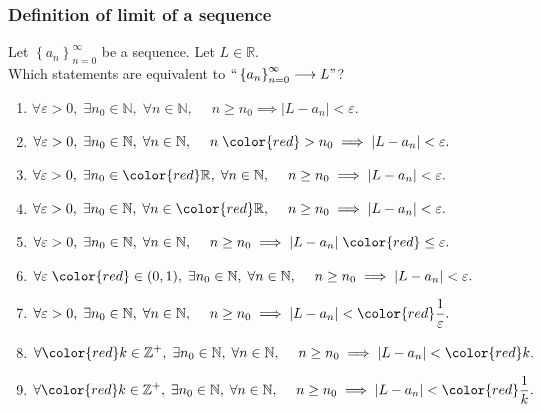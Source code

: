 \begin{frame}[t]
	\fontsize{13}{13}\selectfont
	\frametitle{Definition of limit of a sequence}

	Let $\displaystyle \left\{ a_{n} \right\}_{n=0}^{\infty}$ be a sequence. Let
	$\displaystyle L \in \mathbb{R}$. \\ Which statements are equivalent to $\displaystyle
	``\left\{ a_{n} \right\}_{n=0}^{\infty}\longrightarrow L"$?

	\begin{enumerate}
		\item $\displaystyle \forall \varepsilon>0, \; \exists n_{0}\in \mathbb{N}, \;
			\forall n \in \mathbb{N}, \; \quad n \geq n_{0}\implies |L-a_{n}| < \varepsilon
			.$

		\item $\displaystyle \forall \varepsilon>0, \; \exists n_{0}\in \mathbb{N}, \;
			\forall n \in \mathbb{N}, \; \quad n \;{\color{red} > }\; n_{0}\implies |L-
			a_{n}| < \varepsilon.$

		\item $\displaystyle \forall \varepsilon>0, \; \exists n_{0}\in{\color{red} \mathbb{R}}
			, \; \forall n \in \mathbb{N}, \; \quad n \geq n_{0}\implies |L-a_{n}| < \varepsilon
			.$

		\item $\displaystyle \forall \varepsilon>0, \; \exists n_{0}\in \mathbb{N}, \;
			\forall n \in{\color{red} \mathbb{R}}, \; \quad n \geq n_{0}\implies |L-a_{n}
			| < \varepsilon.$

		\item $\displaystyle \forall \varepsilon>0, \; \exists n_{0}\in \mathbb{N}, \;
			\forall n \in \mathbb{N}, \; \quad n \geq n_{0}\implies |L-a_{n}| \;{\color{red} \leq}
			\; \varepsilon.$

		\item $\displaystyle \forall \varepsilon \;{\color{red} \in (0,1)}, \; \exists
			n_{0}\in \mathbb{N}, \; \forall n \in \mathbb{N}, \; \quad n \geq n_{0}\implies
			|L-a_{n}| < \varepsilon.$

		\item $\displaystyle \forall \varepsilon>0, \; \exists n_{0}\in \mathbb{N}, \;
			\forall n \in \mathbb{N}, \; \quad n \geq n_{0}\implies |L-a_{n}| <{\color{red} \frac{1}{\varepsilon}}
			.$

		\item $\displaystyle \forall{\color{red} k \in \mathbb{Z}^{+}}, \; \exists n_{0}
			\in \mathbb{N}, \; \forall n \in \mathbb{N}, \; \quad n \geq n_{0}\implies
			|L-a_{n}| <{\color{red} k}.$

		\item $\displaystyle \forall{\color{red} k \in \mathbb{Z}^{+}}, \; \exists n_{0}
			\in \mathbb{N}, \; \forall n \in \mathbb{N}, \; \quad n \geq n_{0}\implies
			|L-a_{n}| <{\color{red} \frac{1}{k}}.$
	\end{enumerate}
\end{frame}

